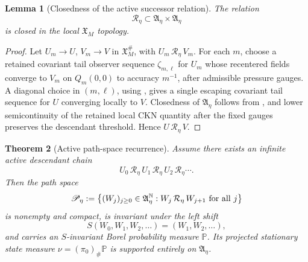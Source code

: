 \documentclass[11pt]{amsart}
\numberwithin{equation}{section}
\theoremstyle{plain}
\newtheorem{theorem}{Theorem}[section]
\newtheorem{lemma}[theorem]{Lemma}
\theoremstyle{definition}
\theoremstyle{remark}
\begin{document}
\begin{lemma}[Closedness of the active successor relation]
\label{lem:closed-active-successor-relation}
The relation
\[
   \mathcal R_\eta\subset\mathfrak A_\eta\times\mathfrak A_\eta
\]
is closed in the local \(\mathfrak X_M\) topology.
\end{lemma}

\begin{proof}
Let \(U_m\to U\), \(V_m\to V\) in \(\mathfrak X_M^\#\), with
\(U_m\,\mathcal R_\eta\,V_m\).  For each \(m\), choose a retained covariant tail
observer sequence \(\zeta_{m,\ell}\) for \(U_m\) whose recentered fields converge
to \(V_m\) on \(Q_m(0,0)\) to accuracy \(m^{-1}\), after admissible pressure
gauges.  A diagonal choice in \((m,\ell)\), using
, gives a
single escaping covariant tail sequence for \(U\) converging locally to \(V\).
Closedness of \(\mathfrak A_\eta\) follows from
, and lower semicontinuity of the retained
local CKN quantity after the fixed gauges preserves the descendant threshold.
Hence \(U\,\mathcal R_\eta\,V\).
\end{proof}

\begin{theorem}[Active path-space recurrence]
\label{thm:active-path-space-recurrence}
Assume there exists an infinite active descendant chain
\[
   U_0\,\mathcal R_\eta\,U_1\,\mathcal R_\eta\,U_2\,
   \mathcal R_\eta\cdots .
\]
Then the path space
\[
   \mathscr P_\eta
   :=
   \left\{
      (W_j)_{j\ge0}\in\mathfrak A_\eta^{\mathbb N}:
      W_j\,\mathcal R_\eta\,W_{j+1}\ \hbox{for all }j
   \right\}
\]
is nonempty and compact, is invariant under the left shift
\[
   S(W_0,W_1,W_2,\ldots)=(W_1,W_2,\ldots),
\]
and carries an \(S\)-invariant Borel probability measure \(\mathbb P\).  Its
projected stationary state measure \(\nu=(\pi_0)_\#\mathbb P\) is supported
entirely on \(\mathfrak A_\eta\).
\end{theorem}
\end{document}
